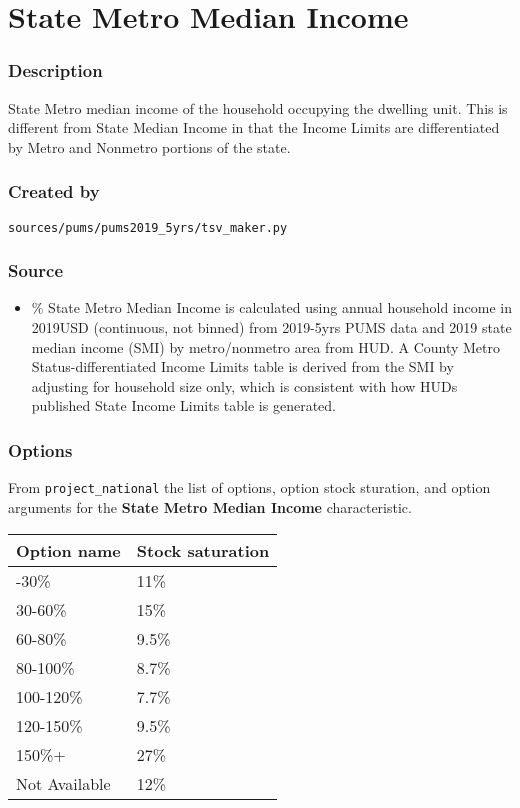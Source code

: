 \section{State Metro Median Income}\label{state_metro_median_income}

\subsubsection{Description}\label{description-139}

State Metro median income of the household occupying the dwelling unit.
This is different from State Median Income in that the Income Limits are
differentiated by Metro and Nonmetro portions of the state.

\subsubsection{Created by}\label{created-by-140}

\texttt{sources/pums/pums2019\_5yrs/tsv\_maker.py}

\subsubsection{Source}\label{source-142}

\begin{itemize}
 
\item
  \% State Metro Median Income is calculated using annual household
  income in 2019USD (continuous, not binned) from 2019-5yrs PUMS data
  and 2019 state median income (SMI) by metro/nonmetro area from HUD. A
  County Metro Status-differentiated Income Limits table is derived from
  the SMI by adjusting for household size only, which is consistent with
  how HUD\textquotesingle s published State Income Limits table is
  generated.
\end{itemize}

\subsubsection{Options}\label{options-143}

From \texttt{project\_national} the list of options, option stock
sturation, and option arguments for the \textbf{State Metro Median
Income} characteristic.

\begin{longtable}[]{@{}ll@{}}
\toprule\noalign{}
Option name & Stock saturation \\
\midrule\noalign{}
\endhead
\bottomrule\noalign{}
\endlastfoot
0-30\% & 11\% \\
30-60\% & 15\% \\
60-80\% & 9.5\% \\
80-100\% & 8.7\% \\
100-120\% & 7.7\% \\
120-150\% & 9.5\% \\
150\%+ & 27\% \\
Not Available & 12\% \\
\end{longtable}

